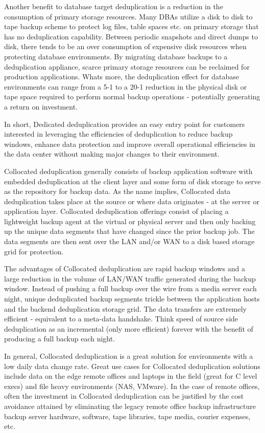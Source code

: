 Another benefit to database target deduplication is a reduction in the consumption of primary storage resources. Many DBAs utilize a disk to disk to tape backup scheme to protect log files, table spaces etc. on primary storage that has no deduplication capability. Between periodic snapshots and direct dumps to disk, there tends to be an over consumption of expensive disk resources when protecting database environments. By migrating database backups to a deduplication appliance, scarce primary storage resources can be reclaimed for production applications. Whats more, the deduplication effect for database environments can range from a 5-1 to a 20-1 reduction in the physical disk or tape space required to perform normal backup operations - potentially generating a return on investment.

In short, Dedicated deduplication provides an easy entry point for customers interested in leveraging the efficiencies of deduplication to reduce backup windows, enhance data protection and improve overall operational efficiencies in the data center without making major changes to their environment. 

Collocated deduplication generally consists of backup application software with embedded deduplication at the client layer and some form of disk storage to serve as the repository for backup data. As the name implies, Collocated data deduplication takes place at the source or where data originates - at the server or application layer. Collocated deduplication offerings consist of placing a lightweight backup agent at the virtual or physical server and then only backing up the unique data segments that have changed since the prior backup job. The data segments are then sent over the LAN and/or WAN to a disk based storage grid for protection.

The advantages of Collocated deduplication are rapid backup windows and a large reduction in the volume of LAN/WAN traffic generated during the backup window. Instead of pushing a full backup over the wire from a media server each night, unique deduplicated backup segments trickle between the application hosts and the backend deduplication storage grid. The data transfers are extremely efficient - equivalent to a meta-data handshake. Think speed of source side deduplication as an incremental (only more efficient) forever with the benefit of producing a full backup each night.

In general, Collocated deduplication is a great solution for environments with a low daily data change rate. Great use cases for Collocated deduplication solutions include data on the edge  remote offices and laptops in the field (great for C level execs) and file heavy environments (NAS, VMware). In the case of remote offices, often the investment in Collocated deduplication can be justified by the cost avoidance attained by eliminating the legacy remote office backup infrastructure  backup server hardware, software, tape libraries, tape media, courier expenses, etc.

